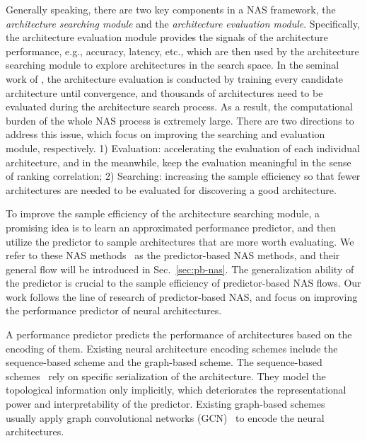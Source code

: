 \documentclass[runningheads]{llncs}
\begin{document}
Generally speaking, there are two key components in a NAS framework, the 
\textit{architecture searching module} and the \textit{architecture evaluation module}. Specifically, the architecture evaluation module provides the signals of the architecture performance, e.g., accuracy, latency, etc., which are then used by the architecture searching module to explore architectures in the search space.
In the seminal work of \cite{zoph2016neural}, the architecture evaluation is conducted by training every candidate architecture until convergence, 
and thousands of architectures need to be evaluated during the architecture search process. As a result, the computational burden of the whole NAS process is extremely large. There are two directions to address this issue, which focus on
improving the searching and evaluation module, respectively. 1) Evaluation: accelerating the evaluation of each individual architecture, and in the meanwhile, keep the evaluation meaningful in the sense of ranking correlation; 2) Searching: increasing the sample efficiency so that fewer architectures are needed to be evaluated for discovering a good architecture.



To improve the sample efficiency of the architecture searching module, a promising idea is to learn an approximated performance predictor, and then utilize the predictor to sample architectures that are more worth evaluating. We refer to these NAS methods~\cite{liu2018progressive,nao2018,wang2018alphax} as the predictor-based NAS methods, and their general flow will be introduced in Sec.~\ref{sec:pb-nas}. The generalization ability of the predictor is crucial to the sample efficiency of predictor-based NAS flows. Our work follows the line of research of predictor-based NAS, and focus on improving the performance predictor of neural architectures. 



A performance predictor predicts the performance of architectures based on the encoding of them. Existing neural architecture encoding schemes include the sequence-based scheme and the graph-based scheme. The sequence-based schemes~\cite{nao2018,liu2018progressive,wang2018alphax} rely on specific serialization of the architecture. %
They model the topological information only implicitly, which deteriorates the representational power and interpretability of the predictor.
Existing graph-based schemes~\cite{guo2019nat,shi2019multi} usually apply graph convolutional networks (GCN)~\cite{kipf2016semi} to encode the neural architectures.
\end{document}
